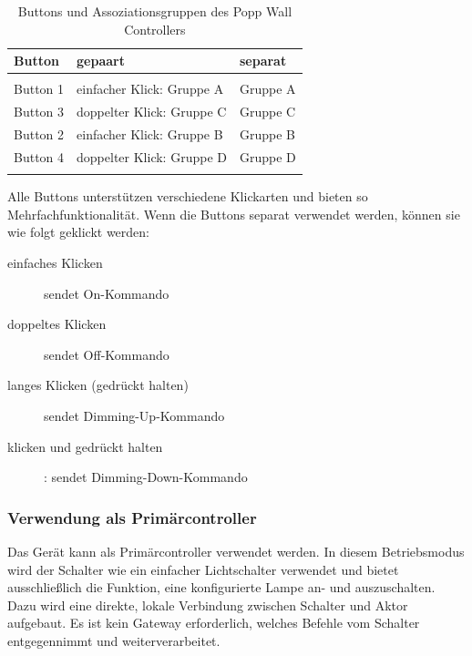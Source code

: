 \begin{longtabu} to 
	\hline
	\textbf{Button} &
	\textbf{gepaart} &
	\textbf{separat} \\
	\hline
	\endhead
	  \\
	\endfoot
	\endlastfoot
	
	Button 1 		& einfacher Klick: Gruppe A & Gruppe A \\
	 
	Button 3		& doppelter Klick: Gruppe C & Gruppe C \\
	\hline
	Button 2		& einfacher Klick: Gruppe B & Gruppe B \\
	 
	Button 4		& doppelter Klick: Gruppe D & Gruppe D \\
	\hline
	
	\caption{Buttons und Assoziationsgruppen des Popp Wall Controllers}
\end{longtabu}


Alle Buttons unterstützen verschiedene Klickarten und bieten so Mehrfachfunktionalität. Wenn die Buttons separat verwendet werden, können sie wie folgt geklickt werden:

\begin{description}
	\item [einfaches Klicken] sendet On-Kommando
	\item [doppeltes Klicken] sendet Off-Kommando
	\item [langes Klicken (gedrückt halten)] sendet Dimming-Up-Kommando
	\item [klicken und gedrückt halten]: sendet Dimming-Down-Kommando
\end{description}

\subsubsection{Verwendung als Primärcontroller}
Das Gerät kann als Primärcontroller verwendet werden. In diesem Betriebsmodus wird der Schalter wie ein einfacher Lichtschalter verwendet und bietet ausschließlich die Funktion, eine konfigurierte Lampe an- und auszuschalten. Dazu wird eine direkte, lokale Verbindung zwischen Schalter und Aktor aufgebaut. Es ist kein Gateway erforderlich, welches Befehle vom Schalter entgegennimmt und weiterverarbeitet.

